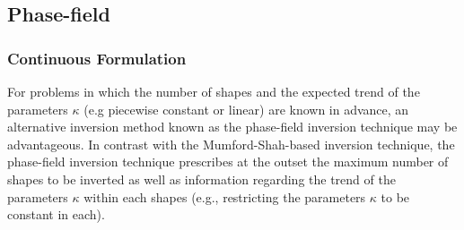 \documentclass[manuscript,revised]{geophysics}
\begin{document}

\subsection{Phase-field}
\subsubsection{Continuous Formulation}

For problems in which the number of shapes and the expected trend of the parameters $\kappa$ (e.g piecewise constant or linear) are known in advance, an alternative inversion method known as the phase-field inversion technique may be advantageous. In contrast with the Mumford-Shah-based inversion technique, the phase-field inversion technique prescribes at the outset the maximum number of shapes to be inverted as well as information regarding the trend of the parameters $\kappa$ within each shapes (e.g., restricting the parameters $\kappa$ to be constant in each). 
\end{document}
